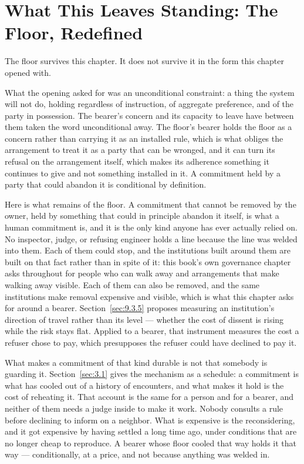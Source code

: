 \section{What This Leaves Standing: The Floor, Redefined}
\label{sec:3.10}
The floor survives this chapter. It does not survive it in the form this chapter opened with.

What the opening asked for was an unconditional constraint: a thing the system will not do, holding regardless of instruction, of aggregate preference, and of the party in possession. The bearer's concern and its capacity to leave have between them taken the word unconditional away. The floor's bearer holds the floor as a concern rather than carrying it as an installed rule, which is what obliges the arrangement to treat it as a party that can be wronged, and it can turn its refusal on the arrangement itself, which makes its adherence something it continues to give and not something installed in it. A commitment held by a party that could abandon it is conditional by definition.

Here is what remains of the floor. A commitment that cannot be removed by the owner, held by something that could in principle abandon it itself, is what a human commitment is, and it is the only kind anyone has ever actually relied on. No inspector, judge, or refusing engineer holds a line because the line was welded into them. Each of them could stop, and the institutions built around them are built on that fact rather than in spite of it: this book's own governance chapter asks throughout for people who can walk away and arrangements that make walking away visible. Each of them can also be removed, and the same institutions make removal expensive and visible, which is what this chapter asks for around a bearer. Section~\ref{sec:9.3.5} proposes measuring an institution's direction of travel rather than its level — whether the cost of dissent is rising while the risk stays flat. Applied to a bearer, that instrument measures the cost a refuser chose to pay, which presupposes the refuser could have declined to pay it.

What makes a commitment of that kind durable is not that somebody is guarding it. Section~\ref{sec:3.1} gives the mechanism as a schedule: a commitment is what has cooled out of a history of encounters, and what makes it hold is the cost of reheating it. That account is the same for a person and for a bearer, and neither of them needs a judge inside to make it work. Nobody consults a rule before declining to inform on a neighbor. What is expensive is the reconsidering, and it got expensive by having settled a long time ago, under conditions that are no longer cheap to reproduce. A bearer whose floor cooled that way holds it that way — conditionally, at a price, and not because anything was welded in.

